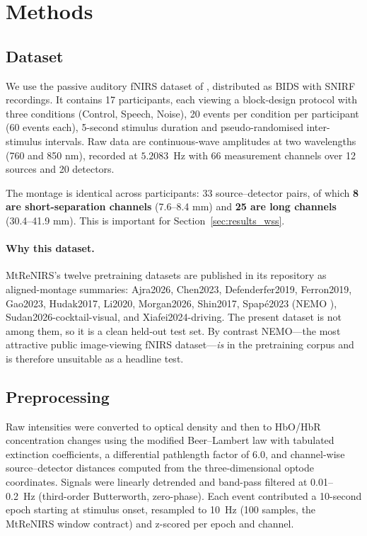 \section{Methods}
\label{sec:methods}

\subsection{Dataset}
We use the passive auditory fNIRS dataset of \citet{luke2021passive}, distributed as BIDS with
SNIRF recordings. It contains 17 participants, each viewing a block-design protocol with three
conditions (Control, Speech, Noise), 20 events per condition per participant (60 events each),
5-second stimulus duration and pseudo-randomised inter-stimulus intervals. Raw data are
continuous-wave amplitudes at two wavelengths (760 and 850 nm), recorded at
$5.2083$~Hz with 66 measurement channels over 12 sources and 20 detectors.

The montage is identical across participants: 33 source--detector pairs, of which
\textbf{8 are short-separation channels} (7.6--8.4 mm) and \textbf{25 are long channels}
(30.4--41.9 mm). This is important for Section~\ref{sec:results_wss}.

\paragraph{Why this dataset.} MtReNIRS's twelve pretraining datasets are published in its
repository as aligned-montage summaries: Ajra2026, Chen2023, Defenderfer2019, Ferron2019,
Gao2023, Hudak2017, Li2020, Morgan2026, Shin2017, Spap\'e2023 (NEMO \citep{spape2024nemo}),
Sudan2026-cocktail-visual, and Xiafei2024-driving. The present dataset is not among them, so it
is a clean held-out test set. By contrast NEMO---the most attractive public image-viewing fNIRS
dataset---\emph{is} in the pretraining corpus and is therefore unsuitable as a headline test.

\subsection{Preprocessing}
\label{sec:preproc}
Raw intensities were converted to optical density and then to HbO/HbR concentration changes using
the modified Beer--Lambert law with tabulated extinction coefficients, a differential pathlength
factor of 6.0, and channel-wise source--detector distances computed from the three-dimensional
optode coordinates. Signals were linearly detrended and band-pass filtered at 0.01--0.2~Hz
(third-order Butterworth, zero-phase). Each event contributed a 10-second epoch starting at
stimulus onset, resampled to 10~Hz (100 samples, the MtReNIRS window contract) and z-scored per
epoch and channel.

